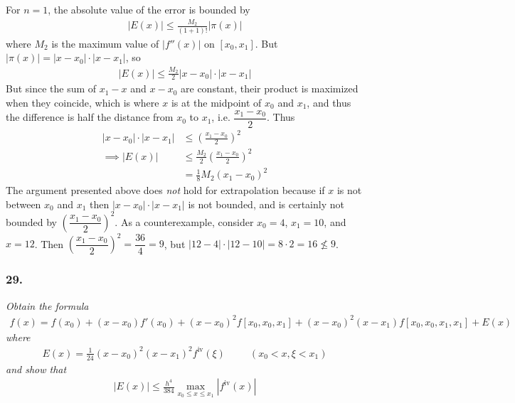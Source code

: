 \documentclass[12pt]{article}
\begin{document}
\noindent For $n = 1$, the absolute value of the error is bounded by
\begin{align*}
|E(x)| \leq \frac{M_2}{(1+1)!}|\pi(x)|
\end{align*}
where $M_2$ is the maximum value of $|f''(x)|$ on $[x_0, x_1]$.  But $|\pi(x)| = |x - x_0|\cdot|x - x_1|$, so
\begin{align*}
|E(x)| \leq \frac{M_2}{2}|x - x_0|\cdot|x - x_1|
\end{align*}
But since the sum of $x_1 - x$ and $x - x_0$ are constant, their product is maximized when they coincide, which is where $x$ is at the midpoint of $x_0$ and $x_1$, and thus the difference is half the distance from $x_0$ to $x_1$, i.e. $\dfrac{x_1 - x_0}{2}$.  Thus
\begin{align*}
|x - x_0|\cdot|x - x_1| &\leq \left(\frac{x_1 - x_0}{2}\right)^2 \\
\implies |E(x)| &\leq \frac{M_2}{2}\left(\frac{x_1 - x_0}{2}\right)^2 \\
&= \frac{1}{8}M_2(x_1 - x_0)^2
\end{align*}
The argument presented above does {\it not} hold for extrapolation because if $x$ is not between $x_0$ and $x_1$ then $|x - x_0|\cdot|x - x_1|$ is not bounded, and is certainly not bounded by $\left(\dfrac{x_1 - x_0}{2}\right)^2$.  As a counterexample, consider $x_0 = 4$, $x_1 = 10$, and $x = 12$.  Then $\left(\dfrac{x_1 - x_0}{2}\right)^2 = \dfrac{36}{4} = 9$, but $|12 - 4|\cdot|12 - 10| = 8\cdot2 = 16\nleq9$.

\subsubsection*{29.}

{\it Obtain the formula}
\begin{align*}
f(x) = f(x_0) + (x - x_0)f'(x_0) + (x - x_0)^2f[x_0, x_0, x_1] + (x - x_0)^2(x - x_1)f[x_0, x_0, x_1, x_1] + E(x)
\end{align*}
{\it where}
\begin{align*}
E(x) = \frac{1}{24}(x - x_0)^2(x - x_1)^2f^{\text{iv}}(\xi) \ \ \ \ \ \ \ \ \ \ \ (x_0 < x, \xi < x_1)
\end{align*}
{\it and show that}
\begin{align*}
|E(x)| \leq \frac{h^4}{384}\max\limits_{x_0 \leq x \leq x_1} |f^{\text{iv}}(x)|
\end{align*}
\end{document}
